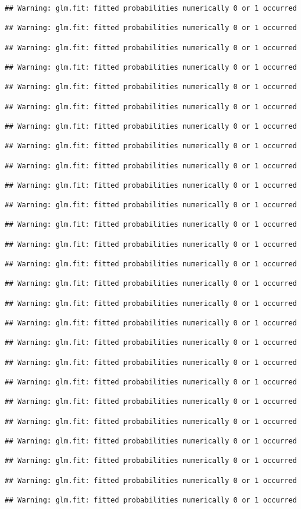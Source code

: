 \documentclass[]{article}
\begin{document}
\begin{verbatim}
## Warning: glm.fit: fitted probabilities numerically 0 or 1 occurred

## Warning: glm.fit: fitted probabilities numerically 0 or 1 occurred

## Warning: glm.fit: fitted probabilities numerically 0 or 1 occurred

## Warning: glm.fit: fitted probabilities numerically 0 or 1 occurred

## Warning: glm.fit: fitted probabilities numerically 0 or 1 occurred

## Warning: glm.fit: fitted probabilities numerically 0 or 1 occurred

## Warning: glm.fit: fitted probabilities numerically 0 or 1 occurred

## Warning: glm.fit: fitted probabilities numerically 0 or 1 occurred

## Warning: glm.fit: fitted probabilities numerically 0 or 1 occurred

## Warning: glm.fit: fitted probabilities numerically 0 or 1 occurred

## Warning: glm.fit: fitted probabilities numerically 0 or 1 occurred

## Warning: glm.fit: fitted probabilities numerically 0 or 1 occurred

## Warning: glm.fit: fitted probabilities numerically 0 or 1 occurred

## Warning: glm.fit: fitted probabilities numerically 0 or 1 occurred

## Warning: glm.fit: fitted probabilities numerically 0 or 1 occurred

## Warning: glm.fit: fitted probabilities numerically 0 or 1 occurred

## Warning: glm.fit: fitted probabilities numerically 0 or 1 occurred

## Warning: glm.fit: fitted probabilities numerically 0 or 1 occurred

## Warning: glm.fit: fitted probabilities numerically 0 or 1 occurred

## Warning: glm.fit: fitted probabilities numerically 0 or 1 occurred

## Warning: glm.fit: fitted probabilities numerically 0 or 1 occurred

## Warning: glm.fit: fitted probabilities numerically 0 or 1 occurred

## Warning: glm.fit: fitted probabilities numerically 0 or 1 occurred

## Warning: glm.fit: fitted probabilities numerically 0 or 1 occurred

## Warning: glm.fit: fitted probabilities numerically 0 or 1 occurred

## Warning: glm.fit: fitted probabilities numerically 0 or 1 occurred
\end{verbatim}
\end{document}
